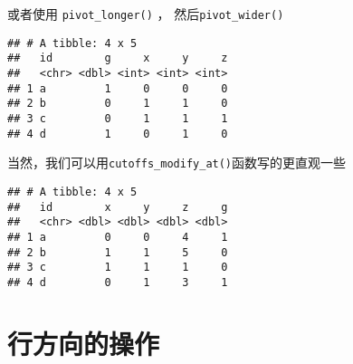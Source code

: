 \documentclass[
]{krantz}
\makeatletter
\newenvironment{Shaded}{\begin{snugshade}}{\end{snugshade}}
\newcommand{\DataTypeTok}[1]{\textcolor[rgb]{0.27,0.27,0.27}{#1}}
\newcommand{\DecValTok}[1]{\textcolor[rgb]{0.06,0.06,0.06}{#1}}
\newcommand{\KeywordTok}[1]{\textcolor[rgb]{0.27,0.27,0.27}{\textbf{#1}}}
\newcommand{\NormalTok}[1]{#1}
\newcommand{\OperatorTok}[1]{\textcolor[rgb]{0.43,0.43,0.43}{\textbf{#1}}}
\newcommand{\StringTok}[1]{\textcolor[rgb]{0.5,0.5,0.5}{#1}}
\newenvironment{kframe}{%
\medskip{}
\setlength{\fboxsep}{.8em}
 \def\at@end@of@kframe{}%
 \ifinner\ifhmode%
  \def\at@end@of@kframe{\end{minipage}}%
  \begin{minipage}{\columnwidth}%
 \fi\fi%
 \def\FrameCommand##1{\hskip\@totalleftmargin \hskip-\fboxsep
 \colorbox{shadecolor}{##1}\hskip-\fboxsep
     \hskip-\linewidth \hskip-\@totalleftmargin \hskip\columnwidth}%
 \MakeFramed {\advance\hsize-\width
   \@totalleftmargin\z@ \linewidth\hsize
   \@setminipage}}%
 {\par\unskip\endMakeFramed%
 \at@end@of@kframe}
\renewenvironment{Shaded}{\begin{kframe}}{\end{kframe}}
\makeatother
\begin{document}
或者使用 \texttt{pivot\_longer()} ， 然后\texttt{pivot\_wider()}

\begin{Shaded}
\end{Shaded}

\begin{verbatim}
## # A tibble: 4 x 5
##   id        g     x     y     z
##   <chr> <dbl> <int> <int> <int>
## 1 a         1     0     0     0
## 2 b         0     1     1     0
## 3 c         0     1     1     1
## 4 d         1     0     1     0
\end{verbatim}

当然，我们可以用\texttt{cutoffs\_modify\_at()}函数写的更直观一些

\begin{Shaded}
\end{Shaded}

\begin{verbatim}
## # A tibble: 4 x 5
##   id        x     y     z     g
##   <chr> <dbl> <dbl> <dbl> <dbl>
## 1 a         0     0     4     1
## 2 b         1     1     5     0
## 3 c         1     1     1     0
## 4 d         0     1     3     1
\end{verbatim}

\hypertarget{rowwise}{%
\chapter{行方向的操作}\label{rowwise}}
\end{document}
